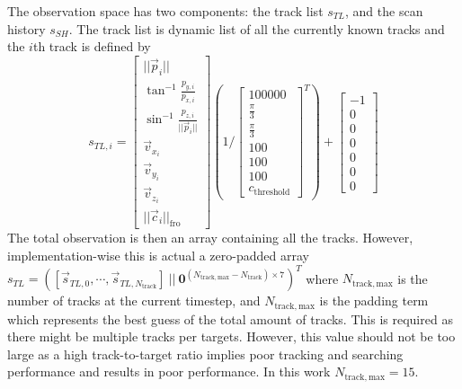 The observation space has two components: the track list $s_{TL}$, and the scan history $s_{SH}$. The track list is dynamic list of all the currently known tracks and the $i$th track is defined by
\begin{equation}
    s_{TL,i} = \begin{bmatrix}
        ||\vec p_i|| \\ \tan^{-1}\frac{p_{y,i}}{p_{x,i}} \\ \sin^{-1}\frac{p_{z,i}}{||\vec p_i||} \\ \vec v_{x_i} \\ \vec v_{y_i} \\\vec v_{z_i} \\||\vec c_i||_\mathrm{fro}
    \end{bmatrix}
    \left( 1/
    \begin{bmatrix}
        100000 \\ \frac{\pi}{3}\\ \frac{\pi}{3} \\ 100 \\ 100 \\ 100  \\ c_\mathrm{threshold}
    \end{bmatrix}^T
    \right)
    +
    \begin{bmatrix}
        -1 \\ 0 \\ 0 \\ 0 \\ 0 \\ 0 \\ 0
    \end{bmatrix}
\end{equation}
The total observation is then an array containing all the tracks.
However, implementation-wise this is actual a zero-padded array $s_{TL} = ([\vec s_{TL,0},\cdots,\vec s_{TL,N_\mathrm{track}}]~||~\mathbf{0}^{(N_\mathrm{track,max}-N_\mathrm{track}) \times 7})^T$ where $N_\mathrm{track,max}$ is the number of tracks at the current timestep, and $N_\mathrm{track,max}$ is the padding term which represents the best guess of the total amount of tracks. This is required as there might be multiple tracks per targets. However, this value should not be too large as a high track-to-target ratio implies poor tracking and searching performance and results in poor performance. In this work $N_\mathrm{track,max} = 15$.

